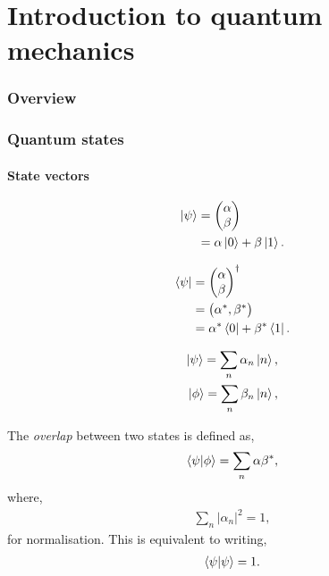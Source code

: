 \documentclass[aps,pra,twocolumn,amsmath,amssymb,nofootinbib,superscriptaddress]{revtex4}
\begin{document}
\part{Introduction to quantum mechanics}

%
%

\section{Overview}

%
%

\section{Quantum states}

%
%

\subsection{State vectors}

\begin{align}
\ket\psi &= \left(\begin{matrix}{}
	\alpha \\
	\beta
\end{matrix}\right)\nonumber\\
&= \alpha\ket{0} + \beta\ket{1}.
\end{align}

\begin{align}
\bra\psi &= \left(\begin{matrix}{}
	\alpha \\
	\beta
\end{matrix}\right)^\dag\nonumber\\
&=\left(\begin{matrix}{}
	\alpha^*, \beta^*
\end{matrix}\right)\nonumber\\
&= \alpha^*\bra{0} + \beta^*\bra{1}.
\end{align}

\begin{align}
	\ket\psi = \sum_n \alpha_n \ket{n},\nonumber\\
	\ket\phi = \sum_n \beta_n \ket{n},
\end{align}

The \textit{overlap} between two states is defined as,
\begin{align}
\braket{\psi|\phi} = \sum_n \alpha\beta^*,
\end{align}
where,
\begin{align}
\sum_n |\alpha_n|^2 = 1,	
\end{align}
for normalisation. This is equivalent to writing,
\begin{align}
\braket{\psi|\psi} = 1.	
\end{align}
\end{document}
